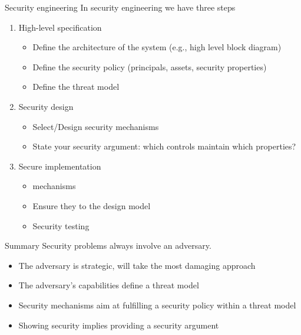 \begin{parag}{Security engineering}
    In security engineering we have three steps 
	\begin{enumerate}
	    \item High-level specification
				\begin{itemize}
				    \item Define the architecture of the system (e.g., high level block diagram)
				    \item Define the security policy (principals, assets, security properties)
					\item Define the threat model 
				\end{itemize}
		\item  Security design
			\begin{itemize}
			    \item Select/Design security mechanisms
			    \item State your security argument: which controls maintain which properties?
			\end{itemize}
		\item Secure implementation
			\begin{itemize}
			\item {} mechanisms
			\item Ensure they  to the design model
			\item Security testing
			\end{itemize}
	\end{enumerate}
	\begin{subparag}{Summary}
	    Security problems always involve an adversary.
		\begin{itemize}
			\item  The adversary is strategic, will take the most damaging approach
			\item The adversary’s capabilities define a threat model
			\item Security mechanisms aim at fulfilling a security policy within a threat model
			\item Showing security implies providing a security argument
		\end{itemize} 
	\end{subparag}
\end{parag}












